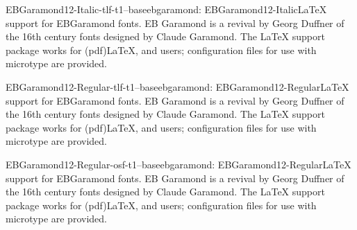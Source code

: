 \documentclass{ddltxtyp}
\begin{document}
\begin{package}{EBGaramond12-Italic-tlf-t1--base}{ebgaramond: EBGaramond12-Italic}{{\LaTeX} support for EBGaramond fonts.}
EB Garamond is a revival by Georg Duffner of the 16th century
fonts designed by Claude Garamond. The {\LaTeX} support package
works for (pdf){\LaTeX}, {\XeLaTeX} and {\LuaLaTeX} users; configuration
files for use with microtype are provided.
\end{package}
\begin{package}{EBGaramond12-Regular-tlf-t1--base}{ebgaramond: EBGaramond12-Regular}{{\LaTeX} support for EBGaramond fonts.}
EB Garamond is a revival by Georg Duffner of the 16th century
fonts designed by Claude Garamond. The {\LaTeX} support package
works for (pdf){\LaTeX}, {\XeLaTeX} and {\LuaLaTeX} users; configuration
files for use with microtype are provided.
\end{package}
\begin{package}{EBGaramond12-Regular-osf-t1--base}{ebgaramond: EBGaramond12-Regular}{{\LaTeX} support for EBGaramond fonts.}
EB Garamond is a revival by Georg Duffner of the 16th century
fonts designed by Claude Garamond. The {\LaTeX} support package
works for (pdf){\LaTeX}, {\XeLaTeX} and {\LuaLaTeX} users; configuration
files for use with microtype are provided.
\end{package}
\end{document}
